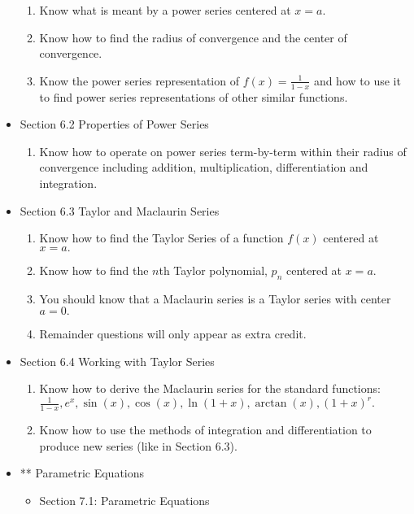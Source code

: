 \documentclass[11pt,fleqn]{article}
\begin{document}
\begin{itemize}
	\begin{enumerate}
	\item Know what is meant by a power series centered at $x=a.$
	\item Know how to find the radius of convergence and the center of convergence.
	\item Know the power series representation of $f(x)=\frac{1}{1-x}$ and how to use it to find power series representations of other similar functions.
	\end{enumerate}

\item Section 6.2 Properties of Power Series\\

	\begin{enumerate}
	\item Know how to operate on power series term-by-term within their radius of convergence including addition, multiplication, differentiation and integration.
	\end{enumerate}

\item Section 6.3 Taylor and Maclaurin Series\\

	\begin{enumerate}
	\item Know how to find the Taylor Series of a function $f(x)$ centered at $x=a.$
	\item Know how to find the $n$th Taylor polynomial, $p_n$ centered at $x=a.$
	\item You should know that a Maclaurin series is a Taylor series with center $a=0.$
	\item Remainder questions will only appear as extra credit.
	\end{enumerate}

\item Section 6.4 Working with Taylor Series\\

	\begin{enumerate}
	\item Know how to derive the Maclaurin series for the standard functions: $\frac{1}{1-x}, e^x, \sin(x), \cos(x), \ln(1+x), \arctan(x), (1+x)^r.$
	\item Know how to use the methods of integration and differentiation to produce new series (like in Section 6.3).
	\end{enumerate}
\item ** Parametric Equations
	\begin{itemize}
	\item Section 7.1: Parametric Equations


\end{itemize}
\end{itemize}
\end{document}

